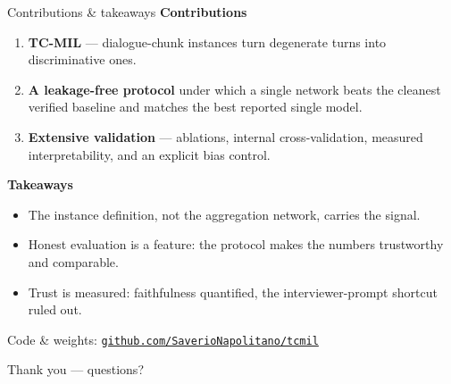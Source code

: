 \documentclass[10pt,aspectratio=169]{beamer}
\newcommand{\good}[1]{\textcolor{mGood}{#1}}
\begin{document}
\begin{frame}{Contributions \& takeaways}
  \textbf{Contributions}
  \begin{enumerate}
    \item \textbf{TC-MIL} --- dialogue-chunk instances turn degenerate turns into discriminative ones.
    \item \textbf{A leakage-free protocol} under which a single network beats the cleanest verified
          baseline and matches the best reported single model.
    \item \textbf{Extensive validation} --- ablations, internal cross-validation, measured
          interpretability, and an explicit bias control.
  \end{enumerate}
  \vfill
  \textbf{Takeaways}
  \begin{itemize}
    \item \good{The instance definition}, not the aggregation network, carries the signal.
    \item \good{Honest evaluation is a feature}: the protocol makes the numbers trustworthy and comparable.
    \item \good{Trust is measured}: faithfulness quantified, the interviewer-prompt shortcut ruled out.
  \end{itemize}
  \vfill
  \begin{center}\small Code \& weights: \href{https://github.com/SaverioNapolitano/tcmil}{\texttt{github.com/SaverioNapolitano/tcmil}}\end{center}
\end{frame}

\begin{frame}[standout]
  Thank you --- questions?
\end{frame}
\end{document}
